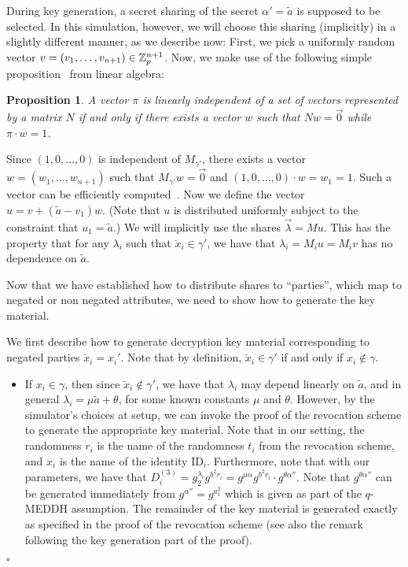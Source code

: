 \documentclass[a4paper, 11pt]{article}
\newtheorem{proposition}[theorem]{Proposition}
\newenvironment{proof}{\par\noindent{\bf Proof.}}{$\square$\par\bigskip}
\theoremstyle{definition}
\newcommand{\ID}{\ensuremath{\textrm{ID}}}
\begin{document}
\begin{proof}
During key generation, a secret sharing of the secret $\alpha' = \tilde{a}$
is supposed to be selected.  In this simulation, however, we will
choose this sharing (implicitly) in a slightly different manner, as we describe now:
First, we pick a uniformly random vector $v = (v_1, \dots, v_{n+1}) \in \mathbb{Z}_p^{n+1}$.
Now, we make use of the following simple
proposition~\cite{ela,Prasolov} from linear algebra:

\begin{proposition} A vector ${\pi}$ is linearly independent of a set of
vectors represented by a matrix $N$ if and only if there exists a
vector ${w}$ such that $N{w}=\vec{0}$ while
${\pi}\cdot{w} = 1$.
\end{proposition}

Since $(1,0,\dots,0)$ is independent of $M_{\gamma'}$, there
exists a vector ${w}=(w_1, \dots, w_{n+1})$ such that $M_{\gamma'}{w}=\vec{0}$ and
$(1,0,\dots,0)\cdot{w} = w_1 = 1$. Such a vector can be
efficiently computed~\cite{ela,Prasolov}.
Now we define the vector $u = v + (\tilde{a}-v_1) w$.
(Note that $u$ is distributed uniformly subject to the constraint
that $u_1 = \tilde{a}$.)
We will implicitly use the shares $\vec{\lambda} = Mu$.
This has the property that for any $\lambda_i$ such that
$\breve{x}_i \in \gamma'$,
we have that $\lambda_i = M_i u = M_i v$ has no dependence on $\tilde{a}$.

Now that we have established how to distribute shares to ``parties'', which map to negated or non
negated attributes, we need to show how to generate the key material.

We first describe how to generate decryption key material corresponding to negated parties $\breve{x}_i = x_i'$. Note that by definition,
$\breve{x}_i \in \gamma'$ if and only if $x_i \notin \gamma$.

\begin{itemize}
\item If $x_i \in \gamma$, then since $\breve{x}_i \notin \gamma'$,
we have that $\lambda_i$ may depend linearly on $\tilde{a}$, and in general $\lambda_i = \mu \tilde{a} + \theta$, for some known constants $\mu$ and $\theta$.
However, by the simulator's choices at setup, we can invoke the proof of the revocation scheme to generate the appropriate key material.  Note that in our setting, the randomness $r_i$ is the name of the randomness $t_i$ from the revocation scheme, and $x_i$ is the name of the identity $\ID_i$.  Furthermore, note that with our parameters, we have that
$D^{(3)}_i = g_2^{\lambda_i}g^{b^2r_i} = g^{\mu \alpha} g^{b^2r_i} \cdot g^{\theta \alpha''}$.  Note that $g^{\theta \alpha''}$ can be generated immediately from $g^{\alpha''} = g^{a_1^2}$ which is given as part of the $q$-MEDDH assumption.  The remainder of the key material is generated exactly as specified in the proof of the revocation scheme (see also the remark following the key generation part of the proof).


\end{itemize}
\end{proof}
\end{document}
